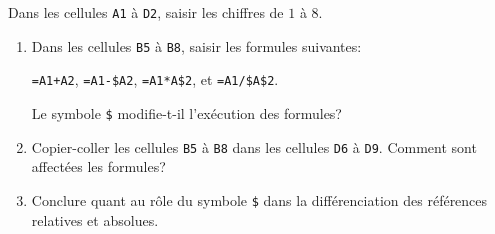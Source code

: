 \documentclass[a4paper, twoside, 11pt]{article}
\begin{document}
\begin{exercise}
  Dans les cellules \verb+A1+ à \verb+D2+, saisir les chiffres de $1$ à $8$.
  \begin{enumerate}
    \item Dans les cellules \verb+B5+ à \verb+B8+, saisir les formules suivantes:
    \begin{center}
      \verb-=A1+A2-, \quad \verb+=A1-$A2+, \quad \verb+=A1*A$2+, \quad et \quad \verb+=A1/$A$2+.
    \end{center}
    Le symbole \verb+$+ modifie-t-il l'exécution des formules?
    \item Copier-coller les cellules \verb+B5+ à \verb+B8+ dans les cellules \verb+D6+ à \verb+D9+. Comment sont affectées les formules?
    \item Conclure quant au rôle du symbole \verb+$+ dans la différenciation des références relatives et absolues.
  \end{enumerate}
\end{exercise}
\end{document}
